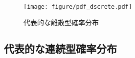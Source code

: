 %
\begin{figure}[H]
	\centering
	\texttt{[image: figure/pdf\_dscrete.pdf]}
	\caption{代表的な離散型確率分布}
	\label{fig:pdf_dscrete}
\end{figure}
%


\subsection{代表的な連続型確率分布}

